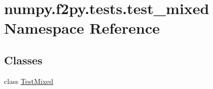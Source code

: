 \hypertarget{namespacenumpy_1_1f2py_1_1tests_1_1test__mixed}{}\section{numpy.\+f2py.\+tests.\+test\+\_\+mixed Namespace Reference}
\label{namespacenumpy_1_1f2py_1_1tests_1_1test__mixed}
\subsection*{Classes}
\begin{DoxyCompactItemize}
\item 
class \hyperlink{classnumpy_1_1f2py_1_1tests_1_1test__mixed_1_1TestMixed}{Test\+Mixed}
\end{DoxyCompactItemize}
